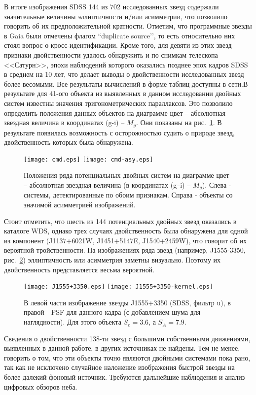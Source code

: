 В итоге изображения SDSS 144 из 702 исследованных звезд содержали значительные величины эллиптичности и/или асимметрии, что позволило говорить об их предположительной кратности. Отметим, что программные звезды в Gaia были отмечены флагом “duplicate source’’, то есть относительно них стоял вопрос о кросс-идентификации. Кроме того, для девяти из этих звезд признаки двойственности удалось обнаружить и по снимкам телескопа <<Сатурн>>, эпохи наблюдений которого оказались позднее эпох кадров SDSS в среднем на 10 лет, что делает выводы о двойственности исследованных звезд более весомыми. Все результаты вычислений в форме таблиц доступны в сети.В результате для 41-ого объекта из выявленных в данном исследовании двойных систем известны значения тригонометрических параллаксов. Это позволило определить положения данных объектов на диаграмме цвет -- абсолютная звездная величина в координатах (g-i) -- $M_g$. Они показаны на рис.~\ref{fig:cmd}. В результате появилась возможность с осторожностью судить о природе звезд, двойственность которых была обнаружена.

\begin{figure}[h]
\centering
\texttt{[image: cmd.eps]}
\texttt{[image: cmd-asy.eps]}
\caption{Положения ряда потенциальных двойных систем на диаграмме цвет -- абсолютная звездная величина (в координатах (g--i) -- $M_g$). Слева - системы, детектированные по обоим признакам. Справа - объекты со значимой асимметрией изображений.}
\label{fig:cmd}
\end{figure}

Стоит отметить, что шесть из 144 потенциальных двойных звезд оказались в каталоге WDS, однако  трех случаях двойственность была обнаружена для одной из компонент (J1137+6021W, J1451+5147E, J1540+2459W), что говорит об их вероятной тройственности. 
На изображениях ряда звезд (например, J1555-3350, рис.~\ref{fig:J1555+3350}) эллиптичность или асимметрия заметны визуально. Поэтому их двойственность представляется весьма вероятной.
\begin{figure}[h]
\centering
\texttt{[image: J1555+3350.eps]}
\texttt{[image: J1555+3350-kernel.eps]}
\caption{В левой части изображение звезды J1555+3350 (SDSS, фильтр u), в правой - PSF для данного кадра (с добавлением шума для наглядности). Для этого объекта $S_e=3.6$, а $S_A=7.9$.}
\label{fig:J1555+3350}
\end{figure}

Сведения о двойственности 138-ти звезд с большими собственными движениями, выявленных в данной работе, в других источниках не найдены. Тем не менее, говорить о том, что эти объекты точно являются двойными системами пока рано, так как не исключено случайное наложение изображения быстрой звезды на более далекий фоновый источник. Требуются дальнейшие наблюдения и анализ цифровых обзоров неба.
